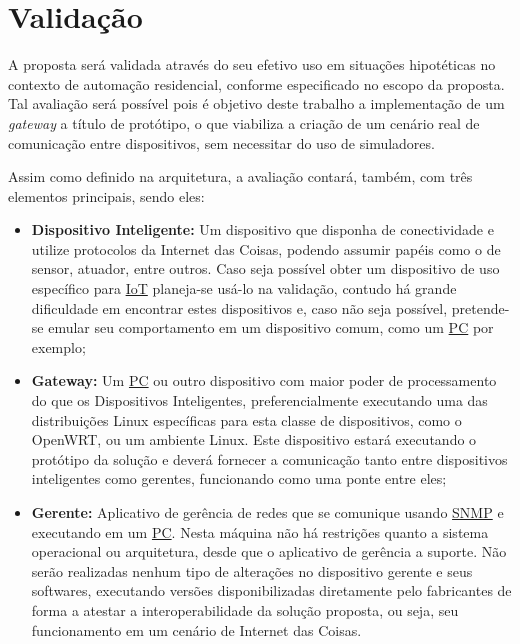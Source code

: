 \documentclass[twoside,english,brazilian]{UNISINOSmonografia}
\begin{document}
\section{Validação}


A proposta será validada através do seu efetivo uso em situações hipotéticas 
no contexto de automação residencial, conforme especificado no escopo da 
proposta.
Tal avaliação será possível pois é objetivo deste trabalho a implementação de 
um \textit{gateway} a título de protótipo, o que viabiliza a criação de um 
cenário real de comunicação entre dispositivos, sem necessitar do uso de 
simuladores.


Assim como definido na arquitetura, a avaliação contará, também, com três 
elementos principais, sendo eles:

\begin{itemize}

	\item \textbf{Dispositivo Inteligente:}
Um dispositivo que disponha de conectividade e utilize protocolos da Internet 
das Coisas, podendo assumir papéis como o de sensor, atuador, entre outros.
Caso seja possível obter um dispositivo de uso específico para \hyperref[siglas]{IoT} planeja-se 
usá-lo na validação, contudo há grande dificuldade em encontrar estes 
dispositivos e, caso não seja possível, pretende-se emular seu comportamento 
em um dispositivo comum, como um \hyperref[siglas]{PC} por exemplo;

	\item \textbf{Gateway:}
Um \hyperref[siglas]{PC} ou outro dispositivo com maior poder de processamento do que os 
Dispositivos Inteligentes, preferencialmente executando uma das distribuições 
Linux específicas para esta classe de dispositivos, como o OpenWRT, ou um 
ambiente Linux.
Este dispositivo estará executando o protótipo da solução e deverá fornecer a 
comunicação tanto entre dispositivos inteligentes como gerentes, funcionando 
como uma ponte entre eles;

	\item \textbf{Gerente:}
Aplicativo de gerência de redes que se comunique usando \hyperref[siglas]{SNMP} e executando em 
um \hyperref[siglas]{PC}.
Nesta máquina não há restrições quanto a sistema operacional ou arquitetura, 
desde que o aplicativo de gerência a suporte.
Não serão realizadas nenhum tipo de alterações no dispositivo gerente e seus 
softwares, executando versões disponibilizadas diretamente pelo fabricantes de 
forma a atestar a interoperabilidade da solução proposta, ou seja, seu 
funcionamento em um cenário de Internet das Coisas.

\end{itemize}
\end{document}

